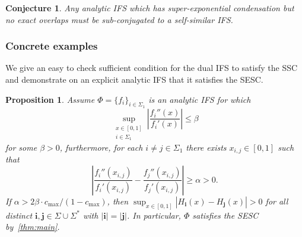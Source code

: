 \documentclass[12pt,]{article}
\newtheorem{proposition}[theorem]{Proposition}
\newtheorem{conjecture}[theorem]{Conjecture}
\theoremstyle{definition}
\theoremstyle{remark}
\newcommand{\0}{\mathbf{0}}
\newcommand{\bi}{\mathbf{i}}
\newcommand{\bj}{\mathbf{j}}
\begin{document}
{\begin{conjecture}
Any analytic IFS which has super-exponential condensation but no exact overlaps must be sub-conjugated to a self-similar IFS.
\end{conjecture}


\subsubsection{Concrete examples}\label{sec:examples}

We give an easy to check sufficient condition for the dual IFS to satisfy the SSC and demonstrate on an explicit analytic IFS that it satisfies the SESC. 

\begin{proposition}\label{prop:example}
Assume $\Phi=\{f_i\}_{i\in\Sigma_1}$ is an analytic IFS for which
\begin{equation*}
\sup_{\substack{x\in[0,1] \\ i\in\Sigma_1}} \left| \frac{f_i''(x)}{f_i'(x)} \right| \leq \beta
\end{equation*}
for some $\beta>0$, furthermore, for each $i\neq j\in\Sigma_1$ there exists $x_{i,j}\in[0,1]$ such that
\begin{equation*}
\left| \frac{f_i''(x_{i,j})}{f_i'(x_{i,j})} - \frac{f_j''(x_{i,j})}{f_j'(x_{i,j})} \right| \geq \alpha >0. 
\end{equation*}
If $\alpha > 2\beta\cdot c_{\max}/(1-c_{\max})$, then 
$
\sup_{x\in[0,1]} |H_{\bi}(x) - H_{\bj}(x)| > 0 
$
for all distinct $\bi,\bj \in\Sigma\cup\Sigma^*$ with $|\bi|=|\bj|$. In particular, $\Phi$ satisfies the SESC by~\cref{thm:main}.
\end{proposition}

}
\end{document}
